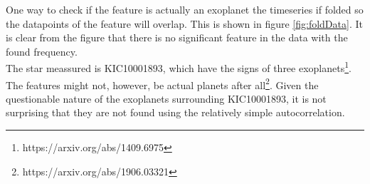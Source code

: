 One way to check if the feature is actually an exoplanet the timeseries if folded so the datapoints of the feature will overlap. This is shown in figure \autoref{fig:foldData}. It is clear from the figure that there is no significant feature in the data with the found frequency.\\
The star meassured is KIC10001893, which have the signs of three exoplanets\footnote{https://arxiv.org/abs/1409.6975}. The features might not, however, be actual planets after all\footnote{https://arxiv.org/abs/1906.03321}. Given the questionable nature of the exoplanets surrounding KIC10001893, it is not surprising that they are not found using the relatively simple autocorrelation.
